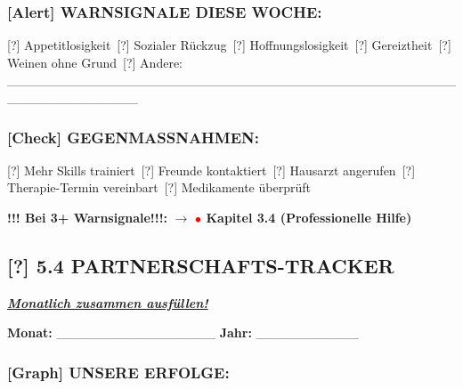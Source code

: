 \hypertarget{section-9}{%
\subsubsection{}\label{section-9}}

\hypertarget{warnsignale-diese-woche}{%
\subsubsection{\texorpdfstring{\textbf{[Alert] WARNSIGNALE DIESE WOCHE:}}{[Alert] WARNSIGNALE DIESE WOCHE:}}\label{warnsignale-diese-woche}}

[?] Appetitlosigkeit\
[?] Sozialer Rückzug\
[?] Hoffnungslosigkeit\
[?] Gereiztheit\
[?] Weinen ohne Grund\
[?] Andere: \_\_\_\_\_\_\_\_\_\_\_\_\_\_\_\_\_\_\_\_\_\_\_\_\_\_\_\_\_\_\_\_\_\_\_\_\_\_\_\_\_\_\_\_\_\_\_\_\_\_\_\_\_\_\_\_\_\_\_\_\_\_

\hypertarget{gegenmassnahmen}{%
\subsubsection{\texorpdfstring{\textbf{[Check] GEGENMASSNAHMEN:}}{[Check] GEGENMASSNAHMEN:}}\label{gegenmassnahmen}}

[?] Mehr Skills trainiert\
[?] Freunde kontaktiert\
[?] Hausarzt angerufen\
[?] Therapie-Termin vereinbart\
[?] Medikamente überprüft

\textbf{!!! Bei 3+ Warnsignale!!!:} $\rightarrow$ \textbf{\textcolor{red}{$\bullet$} Kapitel 3.4 (Professionelle Hilfe)}

\hypertarget{partnerschafts-tracker}{%
\subsection{\texorpdfstring{[?] \textbf{5.4 PARTNERSCHAFTS-TRACKER}}{[?] 5.4 PARTNERSCHAFTS-TRACKER}}\label{partnerschafts-tracker}}

\emph{\textbf{\ul{Monatlich zusammen ausfüllen!}}}

\textbf{Monat:} \_\_\_\_\_\_\_\_\_\_\_\_\_\_\_\_\_ \textbf{Jahr:} \_\_\_\_\_\_\_\_\_\_\_

\hypertarget{section-10}{%
\subsubsection{}\label{section-10}}

\hypertarget{unsere-erfolge}{%
\subsubsection{\texorpdfstring{\textbf{[Graph] UNSERE ERFOLGE:}}{[Graph] UNSERE ERFOLGE:}}\label{unsere-erfolge}}

